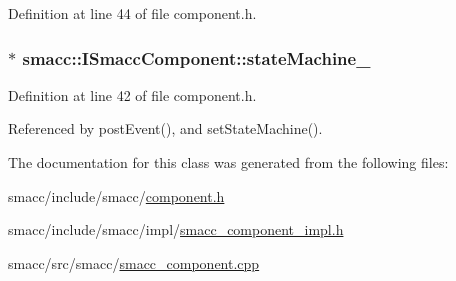 Definition at line 44 of file component.\+h.

\subsubsection[{\texorpdfstring{state\+Machine\+\_\+}{stateMachine_}}]{$\ast$ smacc\+::\+I\+Smacc\+Component\+::state\+Machine\+\_\+\hspace{0.3cm}{\ttfamily [protected]}}\hypertarget{classsmacc_1_1ISmaccComponent_ae3f37acc1679f79299b86872d4b1f80f}{}\label{classsmacc_1_1ISmaccComponent_ae3f37acc1679f79299b86872d4b1f80f}


Definition at line 42 of file component.\+h.



Referenced by post\+Event(), and set\+State\+Machine().



The documentation for this class was generated from the following files\+:\begin{DoxyCompactItemize}
\item 
smacc/include/smacc/\hyperlink{component_8h}{component.\+h}\item 
smacc/include/smacc/impl/\hyperlink{smacc__component__impl_8h}{smacc\+\_\+component\+\_\+impl.\+h}\item 
smacc/src/smacc/\hyperlink{smacc__component_8cpp}{smacc\+\_\+component.\+cpp}\end{DoxyCompactItemize}
